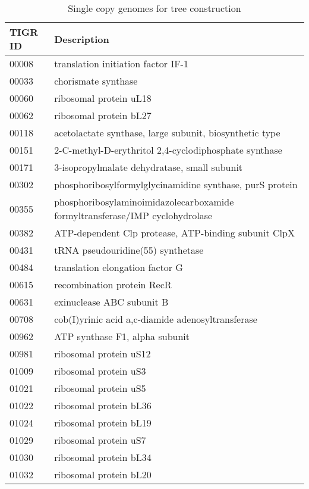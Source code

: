 	\begin{longtable}{p{0.25\asdf}p{0.75\asdf}}
		\caption{Single copy genomes for tree construction}
		\label{tab:single_copy_genes} \\
			\toprule
			\textbf{TIGR ID} 			& \textbf{Description}		\\
			\midrule
			00008 	& translation initiation factor IF-1	\\
			00033	& chorismate synthase 					\\
			00060	& ribosomal protein uL18 				\\
			00062	& ribosomal protein bL27 				\\
			00118	& acetolactate synthase, large subunit, biosynthetic type	\\
			00151	& 2-C-methyl-D-erythritol 2,4-cyclodiphosphate synthase		\\
			00171	& 3-isopropylmalate dehydratase, small subunit				\\
			00302	& phosphoribosylformylglycinamidine synthase, purS protein	\\
			00355	& phosphoribosylaminoimidazolecarboxamide formyltransferase/IMP cyclohydrolase	\\
			00382	& ATP-dependent Clp protease, ATP-binding subunit ClpX		\\
			00431	& tRNA pseudouridine(55) synthetase		\\
			00484	& translation elongation factor G		\\
			00615	& recombination protein RecR			\\
			00631	& exinuclease ABC subunit B 			\\
			00708	& cob(I)yrinic acid a,c-diamide adenosyltransferase			\\
			00962	& ATP synthase F1, alpha subunit 		\\
			00981	& ribosomal protein uS12				\\
			01009	& ribosomal protein uS3					\\
			01021	& ribosomal protein uS5					\\
			01022	& ribosomal protein bL36				\\
			01024	& ribosomal protein bL19				\\
			01029	& ribosomal protein uS7					\\
			01030	& ribosomal protein bL34				\\
			01032	& ribosomal protein bL20				\\

\end{longtable}
